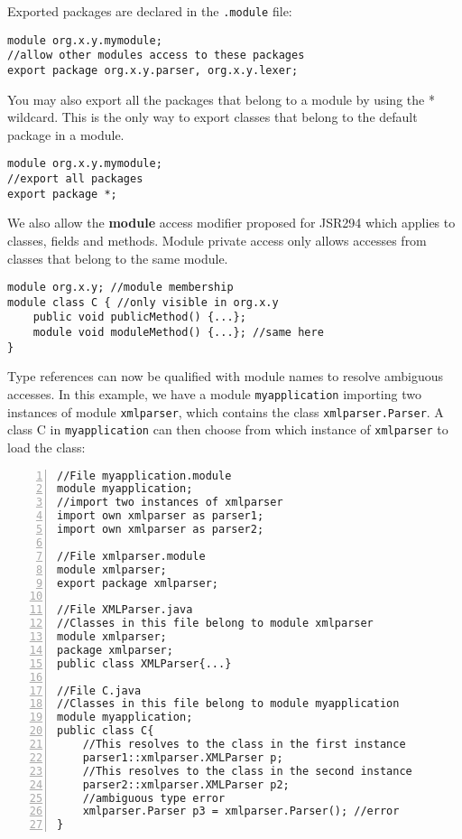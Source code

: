 Exported packages are declared in the {\tt .module} file:

\begin{lstlisting}
module org.x.y.mymodule; 
//allow other modules access to these packages
export package org.x.y.parser, org.x.y.lexer;
\end{lstlisting}

You may also export all the packages that belong to a module by using
the * wildcard. This is the only way to export classes that belong to
the default package in a module.

\begin{lstlisting}
module org.x.y.mymodule;
//export all packages
export package *;
\end{lstlisting}

We also allow the \textbf{module} access modifier proposed for JSR294 \cite{JSR294}
which applies to classes, fields and methods. Module private access only allows
accesses from classes that belong to the same module.

\begin{lstlisting}
module org.x.y; //module membership
module class C { //only visible in org.x.y
	public void publicMethod() {...};
	module void moduleMethod() {...}; //same here
}
\end{lstlisting}


Type references can now be qualified with module names to resolve ambiguous accesses.
In this example, we have a module {\tt myapplication} importing 
two instances of module {\tt xmlparser},
which contains the class {\tt xmlparser.Parser}. 
A class {\tt }C in {\tt myapplication} can then choose from which 
instance of {\tt xmlparser} to load the class:

\begin{lstlisting}[caption=Module Qualified Type References,numbers=left]
//File myapplication.module
module myapplication;
//import two instances of xmlparser
import own xmlparser as parser1; 
import own xmlparser as parser2;

//File xmlparser.module
module xmlparser;
export package xmlparser;

//File XMLParser.java
//Classes in this file belong to module xmlparser
module xmlparser; 
package xmlparser;
public class XMLParser{...}

//File C.java
//Classes in this file belong to module myapplication
module myapplication; 
public class C{
	//This resolves to the class in the first instance
	parser1::xmlparser.XMLParser p;
	//This resolves to the class in the second instance
	parser2::xmlparser.XMLParser p2;
	//ambiguous type error 
	xmlparser.Parser p3 = xmlparser.Parser(); //error
}
\end{lstlisting}

